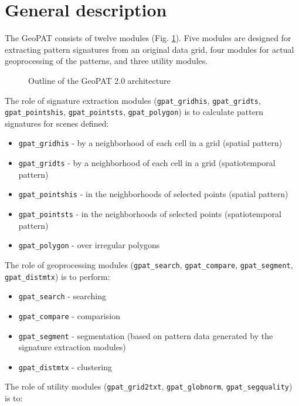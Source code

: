 \section{General description}

The GeoPAT consists of twelve modules (Fig. \ref{FIG:GPAT}).
Five modules are designed for extracting pattern signatures from an original data grid, four modules for actual geoprocessing of the patterns, and three utility modules.

\begin{figure}[H]
 	\centering
	\caption{Outline of the GeoPAT 2.0 architecture}
	\label{FIG:GPAT} 
\end{figure}

The role of signature extraction modules ({\tt gpat\_gridhis}, {\tt gpat\_gridts}, {\tt gpat\_pointshis}, {\tt gpat\_pointsts}, {\tt gpat\_polygon}) is to calculate pattern signatures for scenes defined:

\begin{itemize}
  \item \texttt{gpat\_gridhis} - by a neighborhood of each cell in a grid (spatial pattern)
  \item \texttt{gpat\_gridts} - by a neighborhood of each cell in a grid (spatiotemporal pattern)
  \item \texttt{gpat\_pointshis} - in the neighborhoods of selected points (spatial pattern)
  \item \texttt{gpat\_pointsts} - in the neighborhoods of selected points (spatiotemporal pattern)
  \item \texttt{gpat\_polygon} - over irregular polygons
\end{itemize}

The role of geoprocessing modules ({\tt gpat\_search}, {\tt gpat\_compare}, {\tt gpat\_segment}, {\tt gpat\_distmtx}) is to perform:

\begin{itemize}
  \item \texttt{gpat\_search} - searching
  \item \texttt{gpat\_compare} - comparision
  \item \texttt{gpat\_segment} - segmentation (based on pattern data generated by the signature extraction modules)
  \item \texttt{gpat\_distmtx} - clustering
\end{itemize}

The role of utility modules ({\tt gpat\_grid2txt}, {\tt gpat\_globnorm}, {\tt gpat\_segquality}) is to:

